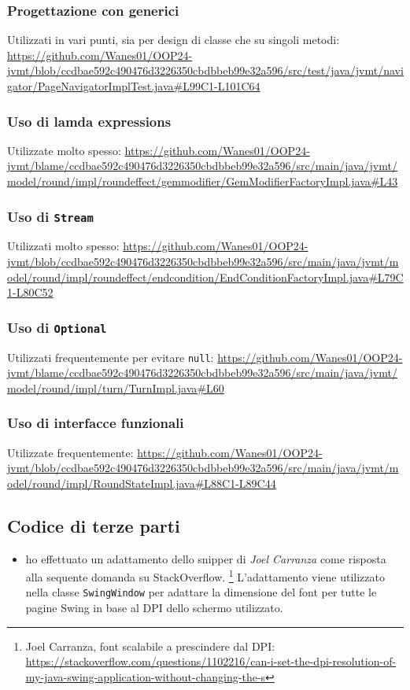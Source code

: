 \documentclass[a4paper,12pt]{report}
\begin{document}
\subsubsection*{Progettazione con generici}
Utilizzati in vari punti, sia per design di classe che su singoli metodi:
\url{https://github.com/Wanes01/OOP24-jvmt/blob/ccdbae592c490476d3226350cbdbbeb99e32a596/src/test/java/jvmt/navigator/PageNavigatorImplTest.java#L99C1-L101C64}

\subsubsection*{Uso di lamda expressions}
Utilizzate molto spesso:
\url{https://github.com/Wanes01/OOP24-jvmt/blame/ccdbae592c490476d3226350cbdbbeb99e32a596/src/main/java/jvmt/model/round/impl/roundeffect/gemmodifier/GemModifierFactoryImpl.java#L43}

\subsubsection*{Uso di \texttt{Stream}}
Utilizzati molto spesso:
\url{https://github.com/Wanes01/OOP24-jvmt/blob/ccdbae592c490476d3226350cbdbbeb99e32a596/src/main/java/jvmt/model/round/impl/roundeffect/endcondition/EndConditionFactoryImpl.java#L79C1-L80C52}

\subsubsection*{Uso di \texttt{Optional}}
Utilizzati frequentemente per evitare \texttt{null}:
\url{https://github.com/Wanes01/OOP24-jvmt/blame/ccdbae592c490476d3226350cbdbbeb99e32a596/src/main/java/jvmt/model/round/impl/turn/TurnImpl.java#L60}

\subsubsection*{Uso di interfacce funzionali}
Utilizzate frequentemente:
\url{https://github.com/Wanes01/OOP24-jvmt/blob/ccdbae592c490476d3226350cbdbbeb99e32a596/src/main/java/jvmt/model/round/impl/RoundStateImpl.java#L88C1-L89C44}

\subsection*{Codice di terze parti}
\begin{itemize}
	\item ho effettuato un adattamento dello snipper di \textit{Joel Carranza} come risposta
	alla sequente domanda su StackOverflow. \footnote{Joel Carranza, font scalabile a prescindere dal DPI: \url{https://stackoverflow.com/questions/1102216/can-i-set-the-dpi-resolution-of-my-java-swing-application-without-changing-the-s}}
	L'adattamento viene utilizzato nella classe \texttt{SwingWindow} per adattare la dimensione del font
	per tutte le pagine Swing in base al DPI dello schermo utilizzato. 
\end{itemize}
\end{document}
